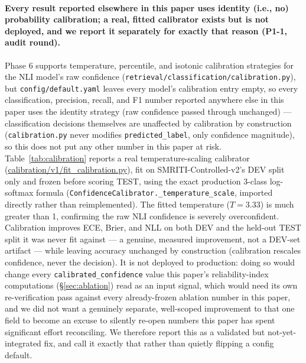 

\paragraph{Every result reported elsewhere in this paper uses identity
(i.e., no) probability calibration; a real, fitted calibrator exists but
is not deployed, and we report it separately for exactly that reason
(P1-1, audit round).} Phase 6 supports temperature, percentile, and
isotonic calibration strategies for the NLI model's raw confidence
(\texttt{retrieval/classification/calibration.py}), but
\texttt{config/default.yaml} leaves every model's calibration entry
empty, so every classification, precision, recall, and F1 number
reported anywhere else in this paper uses the identity strategy (raw
confidence passed through unchanged) --- classification decisions
themselves are unaffected by calibration by construction
(\texttt{calibration.py} never modifies \texttt{predicted\_label}, only
confidence magnitude), so this does not put any other number in this
paper at risk. Table~\ref{tab:calibration} reports a real
temperature-scaling calibrator
(\url{calibration/v1/fit_calibration.py}), fit on
SMRITI-Controlled-v2's DEV split only and frozen before scoring TEST,
using the exact production 3-class log-softmax formula
(\texttt{ConfidenceCalibrator.\_temperature\_scale}, imported directly
rather than reimplemented). The fitted temperature ($T=3.33$) is much
greater than 1, confirming the raw NLI confidence is severely
overconfident. Calibration improves ECE, Brier, and NLL on both DEV and
the held-out TEST split it was never fit against --- a genuine,
measured improvement, not a DEV-set artifact --- while leaving accuracy
unchanged by construction (calibration rescales confidence, never the
decision). It is not deployed to production: doing so would change
every \texttt{calibrated\_confidence} value this paper's reliability-index
computations (\S\ref{sec:ablation}) read as an input signal, which would
need its own re-verification pass against every already-frozen ablation
number in this paper, and we did not want a genuinely separate,
well-scoped improvement to that one field to become an excuse to
silently re-open numbers this paper has spent significant effort
reconciling. We therefore report this as a validated but
not-yet-integrated fix, and call it exactly that rather than quietly
flipping a config default.



